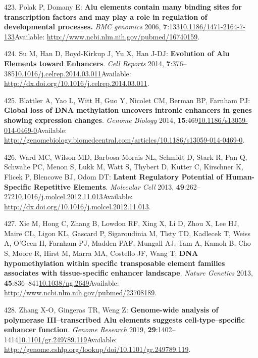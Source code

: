 \documentclass[
]{book}
\begin{document}
\leavevmode\hypertarget{ref-Polak2006}{}%
423. Polak P, Domany E: \textbf{Alu elements contain many binding sites for transcription factors and may play a role in regulation of developmental processes.} \emph{BMC genomics} 2006, \textbf{7}:133\href{https://doi.org/10.1186/1471-2164-7-133}{10.1186/1471-2164-7-133}Available: \url{http://www.ncbi.nlm.nih.gov/pubmed/16740159}.

\leavevmode\hypertarget{ref-Su2014}{}%
424. Su M, Han D, Boyd-Kirkup J, Yu X, Han J-DJ: \textbf{Evolution of Alu Elements toward Enhancers}. \emph{Cell Reports} 2014, \textbf{7}:376--385\href{https://doi.org/10.1016/j.celrep.2014.03.011}{10.1016/j.celrep.2014.03.011}Available: \url{http://dx.doi.org/10.1016/j.celrep.2014.03.011}.

\leavevmode\hypertarget{ref-Blattler2014}{}%
425. Blattler A, Yao L, Witt H, Guo Y, Nicolet CM, Berman BP, Farnham PJ: \textbf{Global loss of DNA methylation uncovers intronic enhancers in genes showing expression changes}. \emph{Genome Biology} 2014, \textbf{15}:469\href{https://doi.org/10.1186/s13059-014-0469-0}{10.1186/s13059-014-0469-0}Available: \url{http://genomebiology.biomedcentral.com/articles/10.1186/s13059-014-0469-0}.

\leavevmode\hypertarget{ref-Ward2013}{}%
426. Ward MC, Wilson MD, Barbosa-Morais NL, Schmidt D, Stark R, Pan Q, Schwalie PC, Menon S, Lukk M, Watt S, Thybert D, Kutter C, Kirschner K, Flicek P, Blencowe BJ, Odom DT: \textbf{Latent Regulatory Potential of Human-Specific Repetitive Elements}. \emph{Molecular Cell} 2013, \textbf{49}:262--272\href{https://doi.org/10.1016/j.molcel.2012.11.013}{10.1016/j.molcel.2012.11.013}Available: \url{http://dx.doi.org/10.1016/j.molcel.2012.11.013}.

\leavevmode\hypertarget{ref-Xie2013}{}%
427. Xie M, Hong C, Zhang B, Lowdon RF, Xing X, Li D, Zhou X, Lee HJ, Maire CL, Ligon KL, Gascard P, Sigaroudinia M, Tlsty TD, Kadlecek T, Weiss A, O'Geen H, Farnham PJ, Madden PAF, Mungall AJ, Tam A, Kamoh B, Cho S, Moore R, Hirst M, Marra MA, Costello JF, Wang T: \textbf{DNA hypomethylation within specific transposable element families associates with tissue-specific enhancer landscape}. \emph{Nature Genetics} 2013, \textbf{45}:836--841\href{https://doi.org/10.1038/ng.2649}{10.1038/ng.2649}Available: \url{http://www.ncbi.nlm.nih.gov/pubmed/23708189}.

\leavevmode\hypertarget{ref-Zhang2019}{}%
428. Zhang X-O, Gingeras TR, Weng Z: \textbf{Genome-wide analysis of polymerase III--transcribed Alu elements suggests cell-type--specific enhancer function}. \emph{Genome Research} 2019, \textbf{29}:1402--1414\href{https://doi.org/10.1101/gr.249789.119}{10.1101/gr.249789.119}Available: \url{http://genome.cshlp.org/lookup/doi/10.1101/gr.249789.119}.
\end{document}
